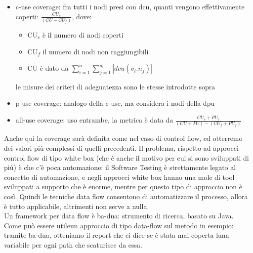 \documentclass{article}
\begin{document}
\begin{itemize}
\item c-use coverage: fra tutti i nodi presi con dcu, quanti vengono effettivamente coperti: $\frac{CU_c}{(CU - CU_f)}$, dove:
\begin{itemize}
\item CU$_{c}$ è il numero di nodi coperti
\item CU$_f$ il numero di nodi non raggiungibili
\item CU è dato da $\sum\limits_{i=1}^{n} \sum\limits_{j=1}^{d_i} |dcu(v_i. n_j)| $
\end{itemize}
le misure dei criteri di adeguatezza sono le stesse introdotte sopra
\item p-use coverage: analogo della c-use, ma considera i nodi della dpu
\item all-use coverage: uso entrambe, la metrica è data da $\frac{CU_c + PU_c}{(CU + PU) - (CU_f + PU_f)}$
\end{itemize}
Anche qui la coverage sarà definita come nel caso di control flow, ed otterremo dei valori più complessi di quelli precedenti. Il problema, rispetto ad approcci control flow di tipo white box (che è anche il motivo per cui si sono sviluppati di più) è che c'è poca automazione: il Software Testing è strettamente legato al concetto di automazione, e negli approcci white box hanno una mole di tool sviluppati a supporto che è enorme, mentre per questo tipo di approccio non è così. Quindi le tecniche data flow consentono di automatizzare il processo, allora è tutto applicabile, altrimenti non serve a nulla.\\ Un framework per data flow è ba-dua: strumento di ricerca, basato su Java.\\ Come può essere utileun approccio di tipo data-flow sul metodo in esempio: tramite ba-dua, otteniamo il report che ci dice se è stata mai coperta luna variabile per ogni path che scaturisce da essa.
\end{document}
